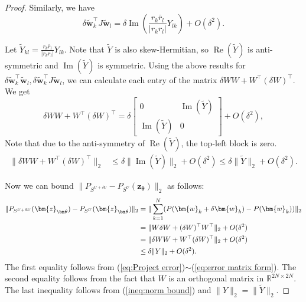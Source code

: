 \documentclass{amsart}
\theoremstyle{plain}
\theoremstyle{definition}
\theoremstyle{remark}
\newcommand{\RR}{\mathbb{R}}
\begin{document}
\begin{proof}
Similarly, we have 
\begin{equation}
    \delta\tilde{\bm{w}}_k^\top J\tilde{\bm{w}}_l=\delta\operatorname{Im}(\frac{r_k\bar r_l}{|r_kr_l|}Y_{lk})+O(\delta^2).
\end{equation}

Let $\tilde Y_{kl}=\frac{r_k\bar r_l}{|r_kr_l|}Y_{lk}$. Note that $\tilde Y$ is also skew-Hermitian, so $\operatorname{Re}(\tilde Y)$ is anti-symmetric and $\operatorname{Im}(\tilde Y)$ is symmetric. Using the above results for  $\delta\tilde{\bm{w}}_k^\top \tilde{\bm{w}}_l,\delta\tilde{\bm{w}}_k^\top J\tilde{\bm{w}}_l$, we can calculate each entry of the matrix $\delta W W+W^\top(\delta W)^\top$. We get
\begin{equation}
    \delta W W+W^\top(\delta W)^\top=\delta \begin{bmatrix}
    0&\operatorname{Im}(\tilde Y)\\
   \operatorname{Im}(\tilde Y)&0
\end{bmatrix}+O(\delta^2),
\end{equation}
Note that due to the anti-symmetry of $\operatorname{Re}(\tilde Y)$, the top-left block is zero.
\begin{align}
\label{ineq:norm bound}
   \|\delta WW+W^\top(\delta W)^\top\|_2&\leq\delta\|\operatorname{Im}(\tilde Y)\|_2+O(\delta^2)\leq \delta\|\tilde Y\|_2+O(\delta^2).
\end{align}

Now we can bound $\|P_{S^{U+\delta U}}-P_{S^U}(\bm{z}_{\bm\theta})\|_2$ as follows:
\begin{align}
\label{eq:final key norm bound}
    \|P_{S^{U+\delta U}}(\bm{z}_{\bm\theta})-P_{S^U}(\bm{z}_{\bm\theta})\|_2&=\|\sum\limits_{k=1}^{N}(P(\bm{w}_k+\delta\bm{w}_k)-P(\bm{w}_k))\|_2\notag\\
    &=\| W\delta W+(\delta W)^\top W^\top\|_2+O(\delta^2)\notag \\
    &=\|\delta W W+W^\top(\delta W)^\top\|_2+O(\delta^2)\notag\\
    &\leq \delta\|Y\|_2+O(\delta^2).
\end{align}
The first equality follows from (\ref{eq:Project error})$\sim$(\ref{eq:error matrix form}). The second equality follows from the fact that $W$ is an orthogonal matrix in $\RR^{2N\times 2N}$. The last inequality follows from (\ref{ineq:norm bound}) and $\|Y\|_2=\|\tilde Y\|_2$.


\end{proof}
\end{document}
